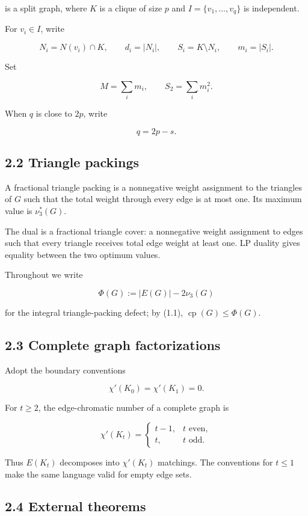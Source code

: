 \documentclass[
  11pt,
]{article}
\begin{document}
is a split graph, where \(K\) is a clique of size \(p\) and
\(I=\{v_1,\ldots,v_q\}\) is independent.

For \(v_i\in I\), write

\[
N_i=N(v_i)\cap K,
\qquad
d_i=|N_i|,
\qquad
S_i=K\setminus N_i,
\qquad
m_i=|S_i|.
\]

Set

\[
M=\sum_i m_i,
\qquad
S_2=\sum_i m_i^2.
\]

When \(q\) is close to \(2p\), write

\[
q=2p-s.
\tag{2.1}
\]

\subsection{2.2 Triangle packings}\label{triangle-packings}

A fractional triangle packing is a nonnegative weight assignment to the
triangles of \(G\) such that the total weight through every edge is at
most one. Its maximum value is \(\nu_3^*(G)\).

The dual is a fractional triangle cover: a nonnegative weight assignment
to edges such that every triangle receives total edge weight at least
one. LP duality gives equality between the two optimum values.

Throughout we write

\[
\Phi(G):=|E(G)|-2\nu_3(G)
\]

for the integral triangle-packing defect; by (1.1),
\(\operatorname{cp}(G)\le\Phi(G)\).

\subsection{2.3 Complete graph
factorizations}\label{complete-graph-factorizations}

Adopt the boundary conventions

\[
\chi'(K_0)=\chi'(K_1)=0.
\]

For \(t\ge2\), the edge-chromatic number of a complete graph is

\[
\chi'(K_t)
=
\begin{cases}
t-1,&t\text{ even},\\
t,&t\text{ odd}.
\end{cases}
\tag{2.2}
\]

Thus \(E(K_t)\) decomposes into \(\chi'(K_t)\) matchings. The
conventions for \(t\le1\) make the same language valid for empty edge
sets.

\subsection{2.4 External theorems}\label{external-theorems}
\end{document}
